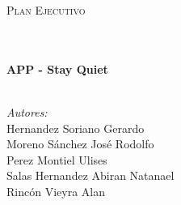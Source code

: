\documentclass[10pt]{article}
\begin{document}
\begin{center}
\begin{minipage}{0.9\textwidth} 
\begin{center}                                                                                  %
\textsc{\LARGE Plan Ejecutivo}
\end{center}
\end{minipage}\\[0.5cm]
            \vspace*{1cm}                                                                       %
\HRule \\[0.4cm]                                                                    %
{ \huge \bfseries APP - Stay Quiet}\\[0.4cm]  %
\HRule \\[1.5cm]                                                                    %
\begin{minipage}{0.46\textwidth}                                                    %
\begin{flushleft} \large                                                            %
\emph{Autores:}\\ 
Hernandez Soriano Gerardo  \\
Moreno Sánchez José Rodolfo\\
Perez Montiel Ulises\\
Salas Hernandez Abiran Natanael\\ 
Rincón Vieyra Alan 
\end{flushleft}                                                                     %
\end{minipage}      
\begin{minipage}{0.52\textwidth}        
\vspace{-0.6cm}                                         %
\begin{flushright} \large                                                           %

\end{flushright}
\end{minipage}
\end{center}
\end{document}
